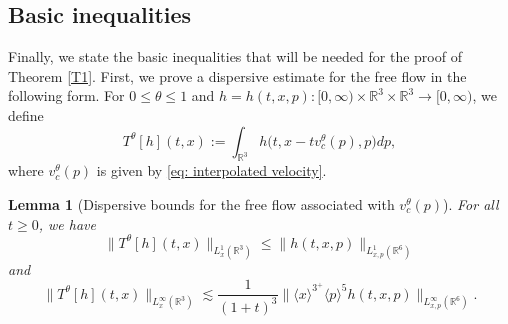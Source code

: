 \documentclass[reqno, 11pt, letterpaper]{amsart}
\newtheorem{lemma}[theorem]{Lemma}
\theoremstyle{remark}
\numberwithin{equation}{section}
\numberwithin{theorem}{section}
\numberwithin{table}{section}
\numberwithin{figure}{section}
\begin{document}
\subsection{Basic inequalities}

Finally, we state the basic inequalities that will be needed for the proof of Theorem \ref{T1}.  
%
First, we prove a dispersive estimate for the free flow in the following form. For $0\leq\theta\leq 1$ and $h=h(t,x,p):[0,\infty)\times\mathbb{R}^3\times\mathbb{R}^3\to[0,\infty)$, we define 
\begin{equation}\label{eq: T[g]}
T^\theta[h](t,x) 
:= \int_{\mathbb{R}^3} h \Big(t, x-tv_c^\theta(p),p\Big) dp,
\end{equation}
where $v_c^\theta(p)$ is given by \eqref{eq: interpolated velocity}.

\begin{lemma}[Dispersive bounds for the free flow associated with $v_c^\theta(p)$]\label{lemma: dispersive bounds for the free flow associated with interpolated v}
For all $t\geq0$, we have
\begin{equation}\label{eq: dispersive bounds for the free flow associated with interpolated v-1}
\big\|T^\theta[h](t,x)\big\|_{L_x^1(\mathbb{R}^3)}\leq \|h(t,x,p)\|_{L_{x,p}^1(\mathbb{R}^6)}
\end{equation}
and
\begin{equation}
\label{eq: dispersive bounds for the free flow associated with interpolated v-2}
\big\|T^\theta[h](t,x)\big\|_{L_x^\infty(\mathbb{R}^3)}\lesssim \frac{1}{(1+t)^3}\Big\|\langle x\rangle^{3^+}\langle p\rangle^5 h(t,x,p)\Big\|_{L_{x,p}^\infty(\mathbb{R}^6)}.
\end{equation}
\end{lemma}
\end{document}
